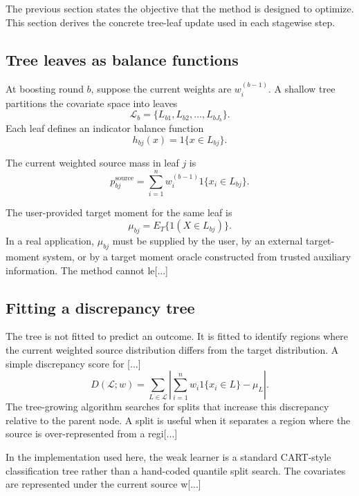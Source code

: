 \documentclass[11pt]{article}
\begin{document}
{The previous section states the objective that the method is designed to optimize. This section derives the concrete tree-leaf update used in each stagewise step.

\subsection{Tree leaves as balance functions}

At boosting round $b$, suppose the current weights are $w_i^{(b-1)}$. A shallow tree partitions the covariate space into leaves
\begin{equation*}
\mathcal{L}_b=\{L_{b1},L_{b2},\ldots,L_{bJ_b}\}.
\end{equation*}
Each leaf defines an indicator balance function
\begin{equation*}
h_{bj}(x)=1\{x\in L_{bj}\}.
\end{equation*}

The current weighted source mass in leaf $j$ is
\begin{equation*}
p_{bj}^{\mathrm{source}}
=
\sum_{i=1}^n w_i^{(b-1)}1\{x_i\in L_{bj}\}.
\end{equation*}

The user-provided target moment for the same leaf is
\begin{equation*}
\mu_{bj}=E_T\{1(X\in L_{bj})\}.
\end{equation*}
In a real application, $\mu_{bj}$ must be supplied by the user, by an external target-moment system, or by a target moment oracle constructed from trusted auxiliary information. The method cannot le[...] 

\subsection{Fitting a discrepancy tree}

The tree is not fitted to predict an outcome. It is fitted to identify regions where the current weighted source distribution differs from the target distribution. A simple discrepancy score for [...]
\begin{equation*}
D(\mathcal{L};w)
=
\sum_{L\in\mathcal{L}}
\left|
\sum_{i=1}^n w_i1\{x_i\in L\}-\mu_L
\right|.
\end{equation*}
The tree-growing algorithm searches for splits that increase this discrepancy relative to the parent node. A split is useful when it separates a region where the source is over-represented from a regi[...] 

In the implementation used here, the weak learner is a standard CART-style classification tree rather than a hand-coded quantile split search. The covariates are represented under the current source w[...] 

}
\end{document}
